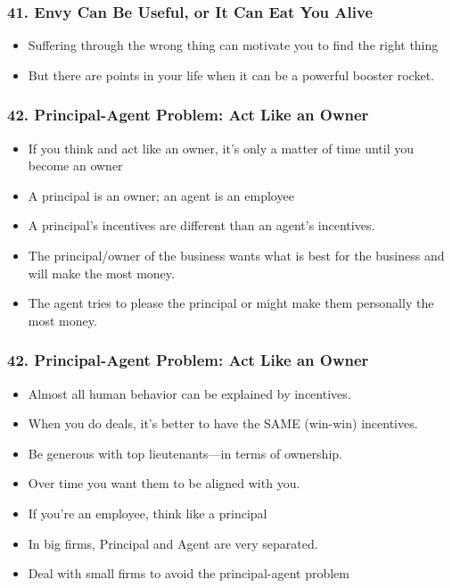 \begin{frame}[fragile]
\frametitle{41. Envy Can Be Useful, or It Can Eat You Alive}
\begin{itemize}
\item Suffering through the wrong thing can motivate you to  find the right thing
\item But there are points in your life when it can be a powerful booster rocket.
\end{itemize}
\end{frame}

\begin{frame}[fragile]
\frametitle{42. Principal-Agent Problem: Act Like an Owner}
\begin{itemize}
\item If you think and act like an owner, it's only a matter of time until you become an owner
\item A principal is an owner; an agent is an employee
\item A principal's incentives are different than an agent's incentives.
\item The principal/owner of the business wants what is best for the business and will make the most money. 
\item  The agent tries to please the principal or might make them personally the most money.
\end{itemize}
\end{frame}

\begin{frame}[fragile]
\frametitle{42. Principal-Agent Problem: Act Like an Owner}
\begin{itemize}
\item Almost all human behavior can be explained by incentives.
\item When you do deals, it’s better to have the SAME (win-win) incentives.
\item Be generous with top lieutenants—in terms of ownership.
\item Over time you want them to be aligned with you.
\item If you’re an employee, think like a principal
\item In big firms, Principal and Agent are very separated. 
\item Deal with small firms to avoid the principal-agent problem
\end{itemize}
\end{frame}


